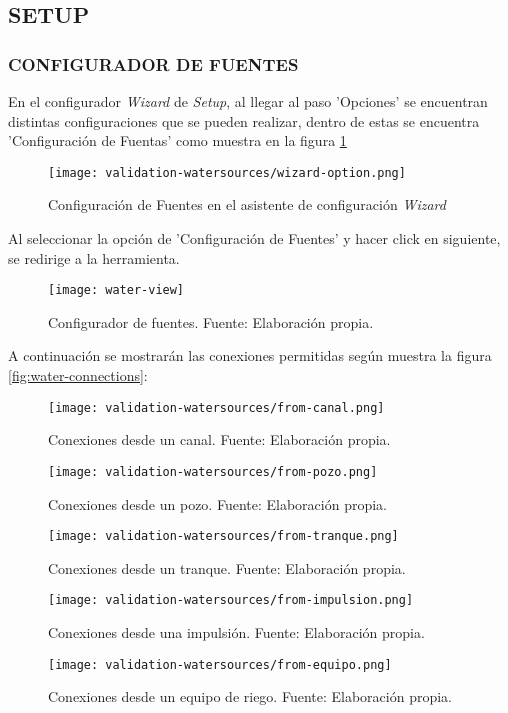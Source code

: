 \subsection{SETUP}

\subsubsection{CONFIGURADOR DE FUENTES}

En el configurador \textit{Wizard} de \textit{Setup}, al llegar al paso 'Opciones' se encuentran distintas configuraciones que se pueden realizar, dentro de estas se encuentra 'Configuración de Fuentas' como muestra en la figura \ref{fig:ws-wizard-option}

\begin{figure}[H]
	\centering
	\texttt{[image: validation-watersources/wizard-option.png]}
	\caption{\label{fig:ws-wizard-option} Configuración de Fuentes en el asistente de configuración \textit{Wizard}}
\end{figure}

Al seleccionar la opción de 'Configuración de Fuentes' y hacer click en siguiente, se redirige a la herramienta.

\begin{figure}[H]
	\centering
	\texttt{[image: water-view]}
	\caption{\label{fig:water-view} Configurador de fuentes. Fuente: Elaboración propia.}
\end{figure}

A continuación se mostrarán las conexiones permitidas según muestra la figura \ref{fig:water-connections}:

\begin{figure}[H]
	\centering
	\texttt{[image: validation-watersources/from-canal.png]}
	\caption{\label{fig:from-canal} Conexiones desde un canal. Fuente: Elaboración propia.}
\end{figure}

\begin{figure}[H]
	\centering
	\texttt{[image: validation-watersources/from-pozo.png]}
	\caption{\label{fig:from-pozo} Conexiones desde un pozo. Fuente: Elaboración propia.}
\end{figure}

\begin{figure}[H]
	\centering
	\texttt{[image: validation-watersources/from-tranque.png]}
	\caption{\label{fig:from-tranque} Conexiones desde un tranque. Fuente: Elaboración propia.}
\end{figure}

\begin{figure}[H]
	\centering
	\texttt{[image: validation-watersources/from-impulsion.png]}
	\caption{\label{fig:from-impulsion} Conexiones desde una impulsión. Fuente: Elaboración propia.}
\end{figure}

\begin{figure}[H]
	\centering
	\texttt{[image: validation-watersources/from-equipo.png]}
	\caption{\label{fig:from-equipo} Conexiones desde un equipo de riego. Fuente: Elaboración propia.}
\end{figure}
\fi